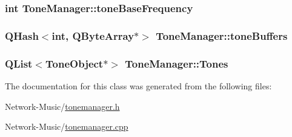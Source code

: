 \hypertarget{class_tone_manager_a13b80ecf3d51ae30210fbe99c5bb2863}{
\subsubsection[{tone\-Base\-Frequency}]{\setlength{\rightskip}{0pt plus 5cm}int Tone\-Manager\-::tone\-Base\-Frequency\hspace{0.3cm}{\ttfamily [protected]}}}\label{class_tone_manager_a13b80ecf3d51ae30210fbe99c5bb2863}
\hypertarget{class_tone_manager_a7f2598af2eb46a6a9ee99bad59aa6db8}{
\subsubsection[{tone\-Buffers}]{\setlength{\rightskip}{0pt plus 5cm}Q\-Hash$<$int, Q\-Byte\-Array$\ast$$>$ Tone\-Manager\-::tone\-Buffers\hspace{0.3cm}{\ttfamily [protected]}}}\label{class_tone_manager_a7f2598af2eb46a6a9ee99bad59aa6db8}
\hypertarget{class_tone_manager_a237856f80ab73ae89e32f59f6962ed41}{
\subsubsection[{Tones}]{\setlength{\rightskip}{0pt plus 5cm}Q\-List$<${\bf Tone\-Object}$\ast$$>$ Tone\-Manager\-::\-Tones\hspace{0.3cm}{\ttfamily [protected]}}}\label{class_tone_manager_a237856f80ab73ae89e32f59f6962ed41}


The documentation for this class was generated from the following files\-:\begin{DoxyCompactItemize}
\item 
Network-\/\-Music/\hyperlink{tonemanager_8h}{tonemanager.\-h}\item 
Network-\/\-Music/\hyperlink{tonemanager_8cpp}{tonemanager.\-cpp}\end{DoxyCompactItemize}
